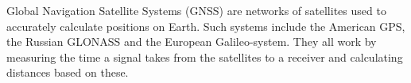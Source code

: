 Global Navigation Satellite Systems (GNSS) are networks of satellites used to accurately calculate positions on
Earth. Such systems include the American GPS, the Russian GLONASS and the European Galileo-system. They all work by
measuring the time a signal takes from the satellites to a receiver and calculating distances based on these.

\endinput
